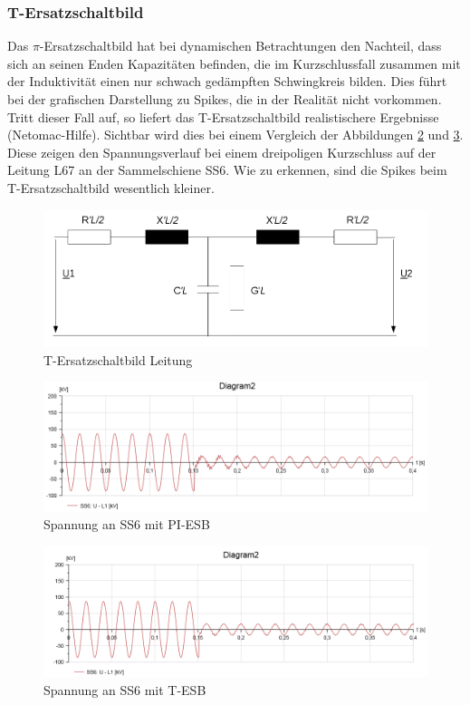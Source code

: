 \documentclass{scrartcl}
\begin{document}
\begin{onehalfspace}
\subsubsection{T-Ersatzschaltbild}
Das $\pi$-Ersatzschaltbild hat bei dynamischen Betrachtungen den Nachteil, dass sich an seinen Enden Kapazitäten befinden, die im Kurzschlussfall zusammen mit der Induktivität einen nur schwach gedämpften Schwingkreis bilden. Dies führt bei der grafischen Darstellung zu \glqq Spikes\grqq{}, die in der Realität nicht vorkommen. Tritt dieser Fall auf, so liefert das T-Ersatzschaltbild realistischere Ergebnisse (Netomac-Hilfe). Sichtbar wird dies bei einem Vergleich der Abbildungen \ref{u-pi} und \ref{u-t}. Diese zeigen den Spannungsverlauf bei einem dreipoligen Kurzschluss auf der Leitung L67 an der Sammelschiene SS6. Wie zu erkennen, sind die \glqq Spikes\grqq{} beim T-Ersatzschaltbild wesentlich kleiner.

	\begin{figure}[H]
	\centering
	\includegraphics[scale=0.5]{img/t-esb.png}
	\caption{T-Ersatzschaltbild Leitung}
	\label{t-esb}
	\end{figure}
	
	\begin{figure}[H]
	\centering
	\includegraphics[scale=0.45]{img/u-pi.png}
	\caption{Spannung an SS6 mit PI-ESB}
	\label{u-pi}
	\end{figure}
	
	\begin{figure}[H]
	\centering
	\includegraphics[scale=0.45]{img/u-t.png}
	\caption{Spannung an SS6 mit T-ESB}
	\label{u-t}
	\end{figure}


\end{onehalfspace}
\end{document}
